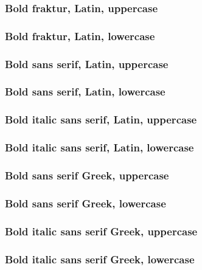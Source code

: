 \documentclass[final]{article}
\newcounter{#1}
\begin{document}
\subsubsection{Bold fraktur, Latin, uppercase}

\subsubsection{Bold fraktur, Latin, lowercase}

\subsubsection{Bold sans serif, Latin, uppercase}

\subsubsection{Bold sans serif, Latin, lowercase}

\subsubsection{Bold italic sans serif, Latin, uppercase}

\subsubsection{Bold italic sans serif, Latin, lowercase}

\subsubsection{Bold sans serif Greek, uppercase}

\subsubsection{Bold sans serif Greek, lowercase}

\subsubsection{Bold italic sans serif Greek, uppercase}

\subsubsection{Bold italic sans serif Greek, lowercase}
\end{document}
